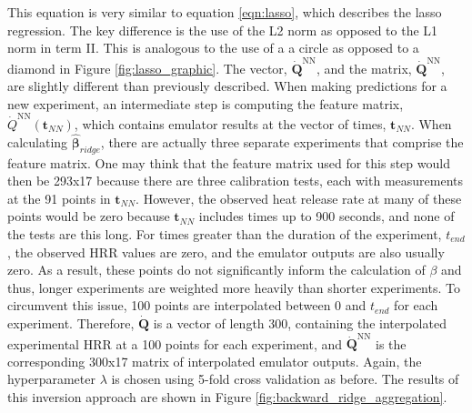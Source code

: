 \documentclass{article}
\begin{document}
This equation is very similar to equation \ref{eqn:lasso}, which describes the lasso regression. The key difference is the use of the L2 norm as opposed to the L1 norm in term II. This is analogous to the use of a a circle as opposed to a diamond in Figure \ref{fig:lasso_graphic}. The vector, $\boldsymbol{\Dot{Q}}^{\text{NN}}$, and the matrix, $\boldsymbol{\Dot{Q}}^{\text{NN}}$, are slightly different than previously described. When making predictions for a new experiment, an intermediate step is computing the feature matrix, $\Dot{Q}^{\text{NN}} (\boldsymbol{t}_{NN})$, which contains emulator results at the vector of times, $\boldsymbol{t}_{NN}$. When calculating $\hat{\boldsymbol{\beta}}_{ridge}$, there are actually three separate experiments that comprise the feature matrix. One may think that the feature matrix used for this step would then be 293x17 because there are three calibration tests, each with measurements at the 91 points in $\boldsymbol{t}_{NN}$. However, the observed heat release rate at many of these points would be zero because $\boldsymbol{t}_{NN}$ includes times up to 900 seconds, and none of the tests are this long. For times greater than the duration of the experiment, $t_{end}$, the observed HRR values are zero, and the emulator outputs are also usually zero. As a result, these points do not significantly inform the calculation of $\beta$ and thus, longer experiments are weighted more heavily than shorter experiments. To circumvent this issue, 100 points are interpolated between 0 and $t_{end}$ for each experiment. Therefore, $\boldsymbol{\dot{Q}}$ is a vector of length 300, containing the interpolated experimental HRR at a 100 points for each experiment, and $\boldsymbol{\Dot{Q}}^{\text{NN}}$ is the corresponding 300x17 matrix of interpolated emulator outputs. Again, the hyperparameter $\lambda$ is chosen using 5-fold cross validation as before. The results of this inversion approach are shown in Figure \ref{fig:backward_ridge_aggregation}.
\end{document}
